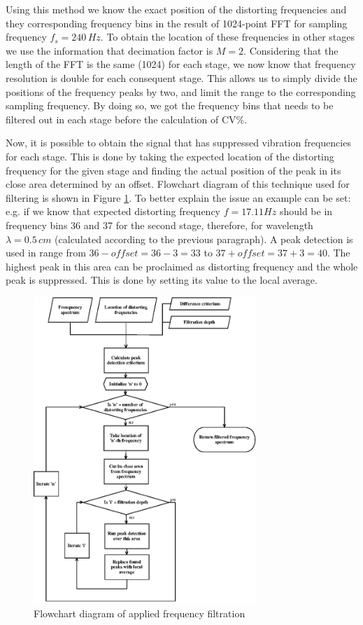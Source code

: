 \documentclass[twoside]{ctuthesis}
\theoremstyle{plain}
\theoremstyle{definition}
\theoremstyle{note}
\begin{document}
Using this method we know the exact position of the distorting frequencies and they corresponding frequency bins in the result of 1024-point FFT for sampling frequency $f_s=240\,Hz$. To obtain the location of these frequencies in other stages we use the information that decimation factor is $M=2$. Considering that the length of the FFT is the same (1024) for each stage, we now know that frequency resolution is double for each consequent stage. This allows us to simply divide the positions of the frequency peaks by two, and limit the range to the corresponding sampling frequency. By doing so, we got the frequency bins that needs to be filtered out in each stage before the calculation of CV\%.

Now, it is possible to obtain the signal that has suppressed vibration frequencies for each stage. This is done by taking the expected location of the distorting frequency for the given stage and finding the actual position of the peak in its close area determined by an offset. Flowchart diagram of this technique used for filtering is shown in Figure \ref{fig:frequencyFiltration}. To better explain the issue an example can be set: e.g. if we know that expected distorting frequency $f=17.11Hz$ should be in frequency bins 36 and 37 for the second stage, therefore, for wavelength $\lambda=0.5\,cm$ (calculated according to the previous paragraph). A peak detection is used in range from $36-offset=36-3=33$ to $37+offset=37+3=40$. The highest peak in this area can be proclaimed as distorting frequency and the whole peak is suppressed. This is done by setting its value to the local average.

\begin{figure}[h]
	\centering
	\includegraphics[width=0.75\textwidth]{frequencyFiltration.eps}
	\caption{Flowchart diagram of applied frequency filtration}
	\label{fig:frequencyFiltration}
\end{figure}
\end{document}
